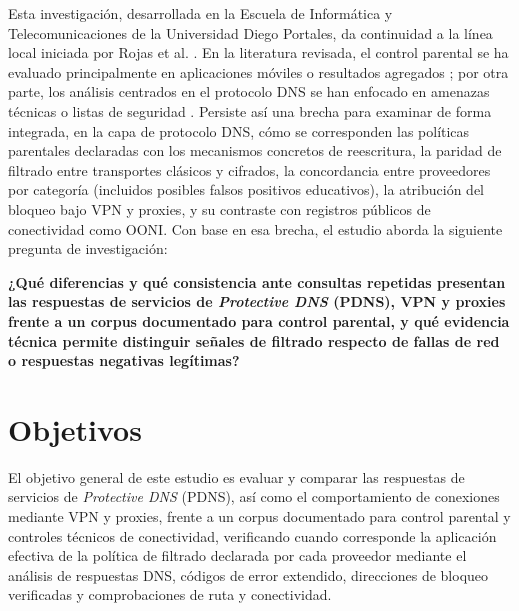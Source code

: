 \documentclass[10pt,a4paper]{article}
\begin{document}
Esta investigación, desarrollada en la Escuela de Informática y Telecomunicaciones de la Universidad Diego Portales, da continuidad a la línea local iniciada por Rojas et al. \cite{rojas2025,rojas2025ieee}. En la literatura revisada, el control parental se ha evaluado principalmente en aplicaciones móviles o resultados agregados \cite{rojas2025,rojas2025ieee}; por otra parte, los análisis centrados en el protocolo DNS se han enfocado en amenazas técnicas o listas de seguridad \cite{liu2024,plonka2025}. Persiste así una brecha para examinar de forma integrada, en la capa de protocolo DNS, cómo se corresponden las políticas parentales declaradas con los mecanismos concretos de reescritura, la paridad de filtrado entre transportes clásicos y cifrados, la concordancia entre proveedores por categoría (incluidos posibles falsos positivos educativos), la atribución del bloqueo bajo VPN y proxies, y su contraste con registros públicos de conectividad como OONI. Con base en esa brecha, el estudio aborda la siguiente pregunta de investigación:

\textbf{¿Qué diferencias y qué consistencia ante consultas repetidas presentan las respuestas de servicios de \emph{Protective DNS} (PDNS), VPN y proxies frente a un corpus documentado para control parental, y qué evidencia técnica permite distinguir señales de filtrado respecto de fallas de red o respuestas negativas legítimas?}

\section{Objetivos}

El objetivo general de este estudio es evaluar y comparar las respuestas de servicios de \emph{Protective DNS} (PDNS), así como el comportamiento de conexiones mediante VPN y proxies, frente a un corpus documentado para control parental y controles técnicos de conectividad, verificando cuando corresponde la aplicación efectiva de la política de filtrado declarada por cada proveedor mediante el análisis de respuestas DNS, códigos de error extendido, direcciones de bloqueo verificadas y comprobaciones de ruta y conectividad.
\end{document}
